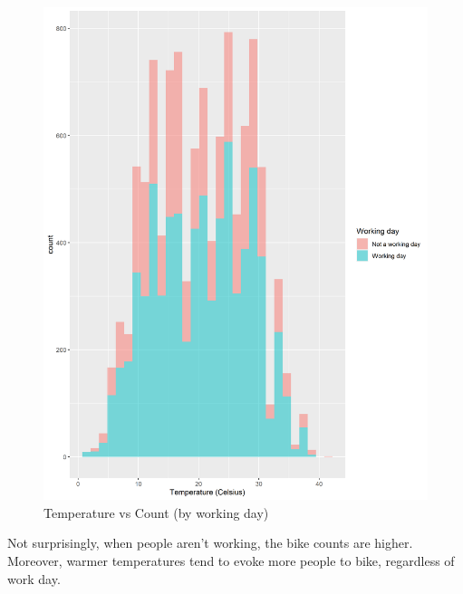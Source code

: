 \documentclass{article}
\begin{document}
\begin{figure}[htp]
    \centering
    \includegraphics[scale = 0.3]{Figures/hist_temp_workingday.png}
    \caption{Temperature vs Count (by working day)}
    \label{fig:my_label}
\end{figure}
Not surprisingly, when people aren't working, the bike counts are higher. Moreover, warmer temperatures tend to evoke more people to bike, regardless of work day.
\end{document}
